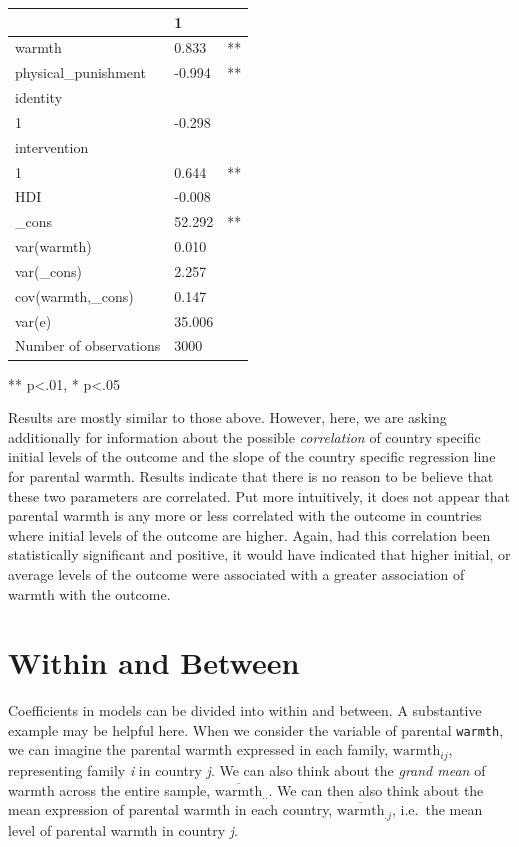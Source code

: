 \documentclass[
  letterpaper,
  DIV=11,
  numbers=noendperiod]{scrreprt}
\begin{document}
\begin{longtable}[]{@{}lll@{}}
\toprule\noalign{}
& 1 & \\
\midrule\noalign{}
\endhead
\bottomrule\noalign{}
\endlastfoot
warmth & 0.833 & ** \\
physical\_punishment & -0.994 & ** \\
identity & & \\
1 & -0.298 & \\
intervention & & \\
1 & 0.644 & ** \\
HDI & -0.008 & \\
\_cons & 52.292 & ** \\
var(warmth) & 0.010 & \\
var(\_cons) & 2.257 & \\
cov(warmth,\_cons) & 0.147 & \\
var(e) & 35.006 & \\
Number of observations & 3000 & \\
\end{longtable}

** p\textless.01, * p\textless.05

Results are mostly similar to those above. However, here, we are asking
additionally for information about the possible \emph{correlation} of
country specific initial levels of the outcome and the slope of the
country specific regression line for parental warmth. Results indicate
that there is no reason to be believe that these two parameters are
correlated. Put more intuitively, it does not appear that parental
warmth is any more or less correlated with the outcome in countries
where initial levels of the outcome are higher. Again, had this
correlation been statistically significant and positive, it would have
indicated that higher initial, or average levels of the outcome were
associated with a greater association of warmth with the outcome.

\section{Within and Between}\label{sec-withinbetween}

Coefficients in models can be divided into within and between. A
substantive example may be helpful here. When we consider the variable
of parental \texttt{warmth}, we can imagine the parental warmth
expressed in each family, \(\text{warmth}_{ij}\), representing family
\emph{i} in country \emph{j}. We can also think about the \emph{grand
mean} of warmth across the entire sample,
\(\overline{\text{warmth}}_{..}\). We can then also think about the mean
expression of parental warmth in each country,
\(\overline{\text{warmth}}_{.j}\), i.e.~the mean level of parental
warmth in country \emph{j}. 
\end{document}

